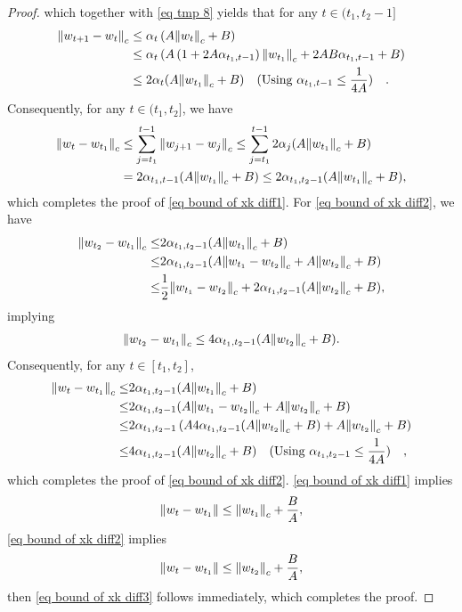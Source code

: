 \documentclass[twoside,11pt]{article}
\numberwithin{assucounter}{section}
\begin{document}
\begin{proof}
  which together with \eqref{eq tmp 8} yields that for any $t \in (t_1, t_2 - 1]$
  \begin{align}
    \norm{w_{t+1} - w_t}_c &\leq \alpha_t \left(A \norm{w_t}_c + B\right) \\
    &\leq \alpha_t \left(A \left(1 + 2A \alpha_{t_1, t-1}\right) \norm{w_{t_1}}_c + 2AB\alpha_{t_1, t-1} + B\right) \\
    &\leq 2 \alpha_t(A\norm{w_{t_1}}_c + B) \qq{(Using $\alpha_{t_1, t-1} \leq \frac{1}{4A}$)}.
  \end{align}
  Consequently, for any $t \in (t_1, t_2]$, we have
  \begin{align}
    \norm{w_t - w_{t_1}}_c &\leq \sum_{j=t_1}^{t-1} \norm{w_{j+1} - w_j}_c \leq \sum_{j=t_1}^{t-1} 2 \alpha_j (A \norm{w_{t_1}}_c + B) \\
    &= 2 \alpha_{t_1, t-1}(A \norm{w_{t_1}}_c + B) \leq 2 \alpha_{t_1, t_2-1} (A\norm{w_{t_1}}_c +B),
  \end{align}
  which completes the proof of \eqref{eq bound of xk diff1}. 
  For \eqref{eq bound of xk diff2},
  we have
  \begin{align}
    \norm{w_{t_2} - w_{t_1}}_c \leq& 2\alpha_{t_1, t_2-1} (A\norm{w_{t_1}}_c + B) \\
    \leq &2\alpha_{t_1, t_2-1} (A\norm{w_{t_1} - w_{t_2}}_c + A\norm{w_{t_2}}_c + B) \\
    \leq& \frac{1}{2}\norm{w_{t_1} - w_{t_2}}_c + 2 \alpha_{t_1, t_2 -1} (A\norm{w_{t_2}}_c + B),
  \end{align}
  implying
  \begin{align}
    \norm{w_{t_2} - w_{t_1}}_c \leq 4\alpha_{t_1, t_2 -1} (A\norm{w_{t_2}}_c + B).
  \end{align}
  Consequently, for any $t \in [t_1, t_2]$,
  \begin{align}
    \norm{w_t - w_{t_1}}_c\leq& 2\alpha_{t_1, t_2-1} (A\norm{w_{t_1}}_c + B) \\
    \leq &2\alpha_{t_1, t_2-1} (A\norm{w_{t_1} - w_{t_2}}_c + A\norm{w_{t_2}}_c + B) \\
    \leq&2\alpha_{t_1, t_2-1} \left(A4\alpha_{t_1, t_2 -1} (A\norm{w_{t_2}}_c + B) + A\norm{w_{t_2}}_c + B\right) \\
    \leq& 4\alpha_{t_1, t_2-1}(A\norm{w_{t_2}}_c + B) \qq{(Using $\alpha_{t_1, t_2-1} \leq \frac{1}{4A}$)},
  \end{align}
  which completes the proof of \eqref{eq bound of xk diff2}.
  \eqref{eq bound of xk diff1} implies
  \begin{align}
    \norm{w_t - w_{t_1}} \leq \norm{w_{t_1}}_c + \frac{B}{A},
  \end{align}
  \eqref{eq bound of xk diff2} implies
  \begin{align}
    \norm{w_t - w_{t_1}} \leq \norm{w_{t_2}}_c + \frac{B}{A},
  \end{align}
  then \eqref{eq bound of xk diff3} follows immediately,
  which completes the proof.
\end{proof}
\end{document}
